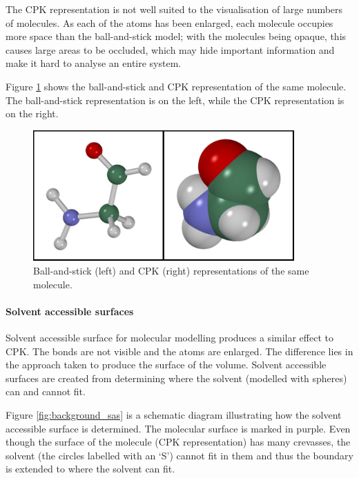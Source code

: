 The CPK representation is not well suited to the visualisation of large numbers
of molecules. As each of the atoms has been enlarged, each molecule occupies
more space than the ball-and-stick model; with the molecules being opaque, this
causes large areas to be occluded, which may hide important information and
make it hard to analyse an entire system.

Figure \ref{fig:background_ball_cpk} shows the ball-and-stick and CPK
representation of the same molecule. The ball-and-stick representation is on
the left, while the CPK representation is on the right.

\begin{figure}
  \begin{center}
    \includegraphics[width=100mm]{ball_cpk}
  \end{center}
  \caption{Ball-and-stick (left) and CPK (right) representations of the same
  molecule.}
  \label{fig:background_ball_cpk}
\end{figure}


\paragraph{Solvent accessible surfaces}

Solvent accessible surface for molecular modelling \citep{connolly83} produces
a similar effect to CPK. The bonds are not visible and the atoms are enlarged.
The difference lies in the approach taken to produce the surface of the volume.
Solvent accessible surfaces are created from determining where the solvent
(modelled with spheres) can and cannot fit.

Figure \ref{fig:background_sas} is a schematic diagram illustrating how the
solvent accessible surface is determined. The molecular surface is marked in
purple. Even though the surface of the molecule (CPK representation) has many
crevasses, the solvent (the circles labelled with an `S') cannot fit in them and
thus the boundary is extended to where the solvent can fit.


